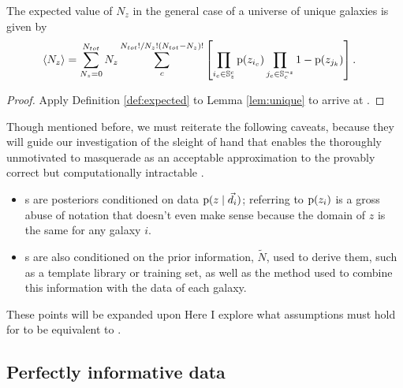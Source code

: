 \begin{theorem}\label{thm:general}
	The expected value of $N_{z}$ in the general case of a universe of unique galaxies is given by
	\begin{align}
	\eqlabel{eqn:complete}
	\langle N_{z} \rangle &= \sum_{N_{z} = 0}^{N_{tot}} N_{z} \sum_{c}^{N_{tot}! / N_{z}! (N_{tot} - N_{z})!} \left[ \prod_{i_{c} \in \mathbb{S}^{c}_{z}} \pr{z_{i_{c}}} \prod_{j_{c} \in \mathbb{S}_{c}^{\lnot z}} 1 - \pr{z_{j_{k}}} \right].
	\end{align}
\end{theorem}
\begin{proof}
	Apply Definition \ref{def:expected} to Lemma \ref{lem:unique} to arrive at .
\end{proof}

Though mentioned before, we must reiterate the following caveats, because they will guide our investigation of the sleight of hand that enables the thoroughly unmotivated  to masquerade as an acceptable approximation to the provably correct but computationally intractable .
\begin{itemize}
	\item \Pzpdf s are posteriors conditioned on data $\mathrm{p}(z \mid \vec{d}_{i})$; referring to $\mathrm{p}(z_{i})$ is a gross abuse of notation that doesn't even make sense because the domain of $z$ is the same for any galaxy $i$.
	\item \Pzpdf s are also conditioned on the prior information, $\tilde{N}$, used to derive them, such as a template library or training set, as well as the method used to combine this information with the data of each galaxy.
\end{itemize}
These points will be expanded upon Here I explore what assumptions must hold for  to be equivalent to .

\subsection{Perfectly informative data}

